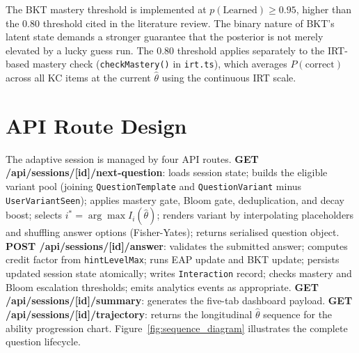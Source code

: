 The BKT mastery threshold is implemented at $p(\text{Learned}) \geq 0.95$,
higher than the $0.80$ threshold cited in the literature review. The binary
nature of BKT's latent state demands a stronger guarantee that the posterior
is not merely elevated by a lucky guess run. The $0.80$ threshold applies
separately to the IRT-based mastery check (\texttt{checkMastery()} in
\texttt{irt.ts}), which averages $P(\text{correct})$ across all KC items at
the current $\hat{\theta}$ using the continuous IRT scale.

\section{API Route Design}
\label{sec:impl_api}

The adaptive session is managed by four API routes. \textbf{GET
/api/sessions/[id]/next-question}: loads session state; builds the eligible
variant pool (joining \texttt{QuestionTemplate} and \texttt{QuestionVariant}
minus \texttt{UserVariantSeen}); applies mastery gate, Bloom gate, deduplication,
and decay boost; selects $i^* = \arg\max I_i(\hat{\theta})$; renders variant
by interpolating placeholders and shuffling answer options (Fisher-Yates);
returns serialised question object. \textbf{POST /api/sessions/[id]/answer}:
validates the submitted answer; computes credit factor from \texttt{hintLevelMax};
runs EAP update and BKT update; persists updated session state atomically;
writes \texttt{Interaction} record; checks mastery and Bloom escalation
thresholds; emits analytics events as appropriate.
\textbf{GET /api/sessions/[id]/summary}: generates the five-tab dashboard payload.
\textbf{GET /api/sessions/[id]/trajectory}: returns the longitudinal
$\hat{\theta}$ sequence for the ability progression chart. Figure~\ref{fig:sequence_diagram}
illustrates the complete question lifecycle.

